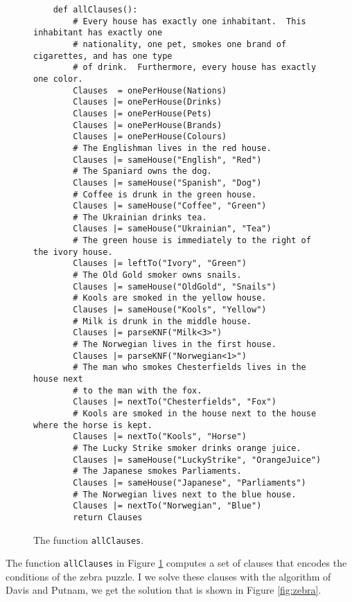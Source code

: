 \begin{figure}[!ht]
\centering
\begin{verbatim}
    def allClauses():
        # Every house has exactly one inhabitant.  This inhabitant has exactly one
        # nationality, one pet, smokes one brand of cigarettes, and has one type
        # of drink.  Furthermore, every house has exactly one color.
        Clauses  = onePerHouse(Nations)
        Clauses |= onePerHouse(Drinks)
        Clauses |= onePerHouse(Pets)
        Clauses |= onePerHouse(Brands)
        Clauses |= onePerHouse(Colours)
        # The Englishman lives in the red house.
        Clauses |= sameHouse("English", "Red")
        # The Spaniard owns the dog.
        Clauses |= sameHouse("Spanish", "Dog")
        # Coffee is drunk in the green house.
        Clauses |= sameHouse("Coffee", "Green")
        # The Ukrainian drinks tea.
        Clauses |= sameHouse("Ukrainian", "Tea")
        # The green house is immediately to the right of the ivory house.
        Clauses |= leftTo("Ivory", "Green")
        # The Old Gold smoker owns snails.
        Clauses |= sameHouse("OldGold", "Snails")
        # Kools are smoked in the yellow house.
        Clauses |= sameHouse("Kools", "Yellow")
        # Milk is drunk in the middle house.
        Clauses |= parseKNF("Milk<3>")
        # The Norwegian lives in the first house.
        Clauses |= parseKNF("Norwegian<1>")
        # The man who smokes Chesterfields lives in the house next 
        # to the man with the fox.
        Clauses |= nextTo("Chesterfields", "Fox")
        # Kools are smoked in the house next to the house where the horse is kept.
        Clauses |= nextTo("Kools", "Horse")
        # The Lucky Strike smoker drinks orange juice.
        Clauses |= sameHouse("LuckyStrike", "OrangeJuice")
        # The Japanese smokes Parliaments.
        Clauses |= sameHouse("Japanese", "Parliaments")
        # The Norwegian lives next to the blue house.
        Clauses |= nextTo("Norwegian", "Blue")
        return Clauses\end{verbatim}
\vspace*{-0.3cm}
\caption{The function \texttt{allClauses}.}
\label{fig:allClauses}
\end{figure}
The function \texttt{allClauses} in Figure \ref{fig:allClauses} computes a set of clauses that encodes the
conditions of the zebra puzzle.  I we solve these clauses with the algorithm of
Davis and Putnam, we get the solution that is shown in Figure \ref{fig:zebra}.

